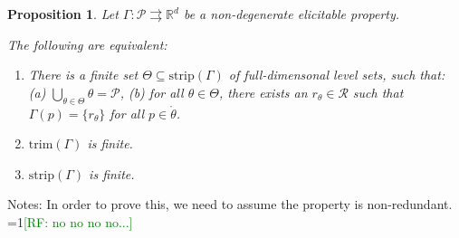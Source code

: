 \documentclass[12pt]{article}
\newcommand{\Comments}{1}
\newcommand{\mynote}[2]{\ifnum\Comments=1\textcolor{#1}{#2}\fi}
\newcommand{\raf}[1]{\mynote{green}{[RF: #1]}}
\newcommand{\reals}{\mathbb{R}}
\renewcommand{\P}{\mathcal{P}}
\newcommand{\R}{\mathcal{R}}
\newcommand{\inter}[1]{\mathring{#1}}%
\newcommand{\toto}{\rightrightarrows}
\newcommand{\trim}{\mathrm{trim}}
\newcommand{\strip}{\mathrm{strip}}
\newtheorem{proposition}{Proposition}
\begin{document}
\begin{proposition}\label{prop:optimal-reports-per-level-set}
  Let $\Gamma:\P\toto\reals^d$ be a non-degenerate elicitable property.

  The following are equivalent:
  \begin{enumerate}
  \item There is a finite set $\Theta \subseteq \strip(\Gamma)$ of full-dimensonal level sets, such that: (a) $\bigcup_{\theta\in\Theta} \theta = \P$, (b) for all $\theta \in \Theta$, there exists an $r_\theta \in \R$ such that $\Gamma(p) = \{r_\theta\}$ for all $p \in \inter{\theta}$.
  \item $\trim(\Gamma)$ is finite.
  \item $\strip(\Gamma)$ is finite.
  \end{enumerate}
\end{proposition}



Notes:
In order to prove this, we need to assume the property is non-redundant.
\raf{no no no no...}
\end{document}
